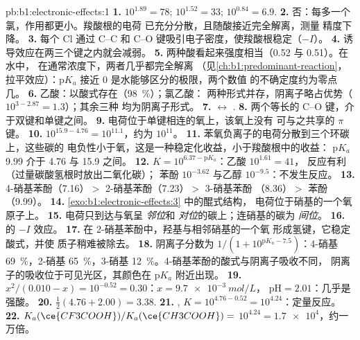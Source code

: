 \begin{solution}{pb:b1:electronic-effects:1}
\textbf{1.} $10^{1.89} = 78$; $10^{1.52} = 33$; $10^{0.84} = 6.9$.
\textbf{2.} 否：每多一个氯，作用都更小。羧酸根的电荷
已充分分散，且随酸接近完全解离，测量
精度下降。
\textbf{3.} 每个 Cl 通过 C--C 和 C--O
键吸引电子密度，使羧酸根稳定（$-I$）。
\textbf{4.} 诱导效应在两三个键之内就会减弱。
\textbf{5.} 两种酸看起来强度相当（0.52 与 0.51）。在水中，
在通常浓度下，两者几乎都完全解离
（见\cref{ch:b1:predominant-reaction}，拉平效应）：$\mathrm{p}K_a$ 接近 0
是水能够区分的极限，两个数值
的不确定度约为零点几。
\textbf{6.} 乙酸：以酸式存在（\qty{98}{\percent}）；氯乙酸：
两种形式并存，阴离子略占优势（$10^{3 - 2.87} = 1.3$）；其余三种
均为阴离子形式。
\textbf{7.}  $\leftrightarrow$ .
\textbf{8.} 两个等长的 C--O 键，介于双键和单键之间。
\textbf{9.} 电荷位于单键相连的氧上，该氧上没有
可与之共享的 $\pi$ 键。
\textbf{10.} $10^{15.9 - 4.76} = 10^{11.1}$，约为 $10^{11}$。
\textbf{11.} 苯氧负离子的电荷分散到三个环碳上，这些碳的
电负性小于氧，这是一种稳定化收益，小于羧酸根中的收益：
$\mathrm{p}K_a$ 9.99 介于 4.76 与 15.9 之间。
\textbf{12.} $K = 10^{6.37 - \mathrm{p}K_a}$：乙酸 $10^{1.61} = 41$，
反应有利（过量碳酸氢根时放出二氧化碳）；
苯酚 $10^{-3.62}$ 与乙醇 $10^{-9.5}$：不发生反应。
\textbf{13.} 4-硝基苯酚（7.16）$>$ 2-硝基苯酚（7.23）$>$ 3-硝基苯酚
（8.36）$>$ 苯酚（9.99）。
\textbf{14.} \cref{exo:b1:electronic-effects:3} 中的醌式结构，
电荷位于硝基的一个氧原子上。
\textbf{15.} 电荷只到达与氧呈 \textit{邻位}和
\textit{对位}的碳上；连硝基的碳为 \textit{间位}。
\textbf{16.}  的 $-I$ 效应。
\textbf{17.} 在 2-硝基苯酚中，羟基与相邻硝基的一个氧
形成氢键，它稳定酸式，并使
质子稍难被除去。
\textbf{18.} 阴离子分数为 $1/(1 + 10^{\mathrm{p}K_a - 7.5})$：4-硝基
\qty{69}{\percent}，2-硝基 \qty{65}{\percent}，3-硝基
\qty{12}{\percent}。4-硝基苯酚的酸式与阴离子吸收不同，
阴离子的吸收位于可见光区，其颜色在 $\mathrm{p}K_a$ 附近出现。
\textbf{19.} $x^2/(0.010 - x) = 10^{-0.52} = 0.30$：$x = \qty{9.7e-3}{mol/L}$，
$\mathrm{pH} = 2.01$：几乎是强酸。
\textbf{20.} $\frac12(4.76 + 2.00) = 3.38$.
\textbf{21.} , $K = 10^{4.76 -
0.52} = 10^{4.24}$：定量反应。
\textbf{22.} $K_a(\ce{CF3COOH})/K_a(\ce{CH3COOH}) =$ \textbf{$10^{4.24} =
\num{1.7e4}$}，约一万倍。
\end{solution}
